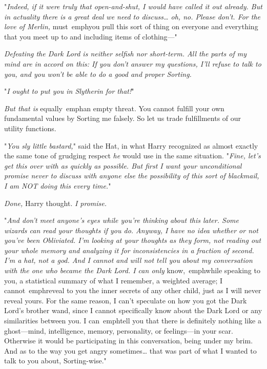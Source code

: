 "\emph{Indeed, if it were truly that open-and-shut, I would have called it out 
already. But in actuality there is a great deal we need to discuss{\ldots} oh, 
no. Please don't. For the love of Merlin,} must\ emph{you pull this sort of 
thing on everyone and everything that you meet up to and including items of 
clothing---}"

\emph{Defeating the Dark Lord is neither selfish nor short-term. All the parts 
of my mind are in accord on this: If you don't answer my questions, I'll refuse 
to talk to you, and you won't be able to do a good and proper Sorting.}

"\emph{I ought to put you in Slytherin for that!}"

\emph{But that is} equally\ emph{an empty threat. You cannot fulfill your own 
fundamental values by Sorting me falsely. So let us trade fulfillments of our 
utility functions.}

"\emph{You sly little bastard,}" said the Hat, in what Harry recognized as 
almost exactly the same tone of grudging respect \emph{he} would use in the 
same situation. "\emph{Fine, let's get this over with as quickly as possible. 
But first I want your unconditional promise never to discuss with anyone else 
the possibility of this sort of blackmail, I am NOT doing this every time.}"

\emph{Done,} Harry thought. \emph{I promise.}

"\emph{And don't meet anyone's eyes while you're thinking about this later. 
Some wizards can read your thoughts if you do. Anyway, I have no idea whether 
or not you've been Obliviated. I'm looking at your thoughts as they form, not 
reading out your whole memory and analyzing it for inconsistencies in a 
fraction of second. I'm a hat, not a god. And I cannot and will not tell you 
about my conversation with the one who became the Dark Lord. I can only} 
know,\ emph{while speaking to you, a statistical summary of what I remember, a 
weighted average; I} cannot\ emph{reveal to you the inner secrets of any other 
child, just as I will never reveal yours. For the same reason, I can't 
speculate on how you got the Dark Lord's brother wand, since I cannot 
specifically know about the Dark Lord or any similarities between you. I} 
can\ emph{tell you that there is definitely nothing like a ghost---mind, 
intelligence, memory, personality, or feelings---in your scar. Otherwise it 
would be participating in this conversation, being under my brim. And as to the 
way you get angry sometimes{\ldots} that was part of what I wanted to talk to 
you about, Sorting-wise.}"

